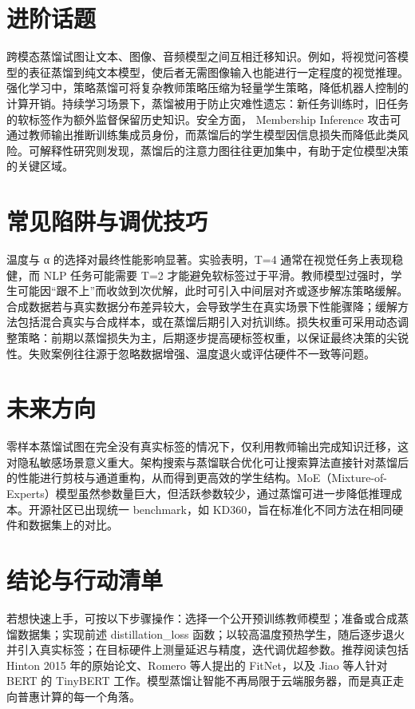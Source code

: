 \chapter{进阶话题}
跨模态蒸馏试图让文本、图像、音频模型之间互相迁移知识。例如，将视觉问答模型的表征蒸馏到纯文本模型，使后者无需图像输入也能进行一定程度的视觉推理。强化学习中，策略蒸馏可将复杂教师策略压缩为轻量学生策略，降低机器人控制的计算开销。持续学习场景下，蒸馏被用于防止灾难性遗忘：新任务训练时，旧任务的软标签作为额外监督保留历史知识。安全方面， Membership Inference 攻击可通过教师输出推断训练集成员身份，而蒸馏后的学生模型因信息损失而降低此类风险。可解释性研究则发现，蒸馏后的注意力图往往更加集中，有助于定位模型决策的关键区域。\par
\chapter{常见陷阱与调优技巧}
温度与 α 的选择对最终性能影响显著。实验表明，T=4 通常在视觉任务上表现稳健，而 NLP 任务可能需要 T=2 才能避免软标签过于平滑。教师模型过强时，学生可能因“跟不上”而收敛到次优解，此时可引入中间层对齐或逐步解冻策略缓解。合成数据若与真实数据分布差异较大，会导致学生在真实场景下性能骤降；缓解方法包括混合真实与合成样本，或在蒸馏后期引入对抗训练。损失权重可采用动态调整策略：前期以蒸馏损失为主，后期逐步提高硬标签权重，以保证最终决策的尖锐性。失败案例往往源于忽略数据增强、温度退火或评估硬件不一致等问题。\par
\chapter{未来方向}
零样本蒸馏试图在完全没有真实标签的情况下，仅利用教师输出完成知识迁移，这对隐私敏感场景意义重大。架构搜索与蒸馏联合优化可让搜索算法直接针对蒸馏后的性能进行剪枝与通道重构，从而得到更高效的学生结构。MoE（Mixture-of-Experts）模型虽然参数量巨大，但活跃参数较少，通过蒸馏可进一步降低推理成本。开源社区已出现统一 benchmark，如 KD360，旨在标准化不同方法在相同硬件和数据集上的对比。\par
\chapter{结论与行动清单}
若想快速上手，可按以下步骤操作：选择一个公开预训练教师模型；准备或合成蒸馏数据集；实现前述 distillation\_{}loss 函数；以较高温度预热学生，随后逐步退火并引入真实标签；在目标硬件上测量延迟与精度，迭代调优超参数。推荐阅读包括 Hinton 2015 年的原始论文、Romero 等人提出的 FitNet，以及 Jiao 等人针对 BERT 的 TinyBERT 工作。模型蒸馏让智能不再局限于云端服务器，而是真正走向普惠计算的每一个角落。\par
